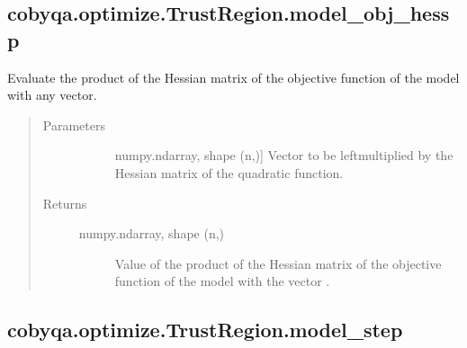 \documentclass[letterpaper,10pt,english]{sphinxmanual}
\begin{document}
\begin{fulllineitems}
\subsection{cobyqa.optimize.TrustRegion.model\_obj\_hessp}
\label{\detokenize{refs/generated/cobyqa.optimize.TrustRegion.model_obj_hessp:cobyqa-optimize-trustregion-model-obj-hessp}}\label{\detokenize{refs/generated/cobyqa.optimize.TrustRegion.model_obj_hessp::doc}}

\begin{fulllineitems}
\label{\detokenize{refs/generated/cobyqa.optimize.TrustRegion.model_obj_hessp:cobyqa.optimize.TrustRegion.model_obj_hessp}}
\sphinxAtStartPar
Evaluate the product of the Hessian matrix of the objective function of
the model with any vector.
\begin{quote}\begin{description}
\item[{Parameters}] \leavevmode\begin{description}
\item[{}] \leavevmode{[}numpy.ndarray, shape (n,){]}
\sphinxAtStartPar
Vector to be left\sphinxhyphen{}multiplied by the Hessian matrix of the quadratic
function.

\end{description}

\item[{Returns}] \leavevmode\begin{description}
\item[{numpy.ndarray, shape (n,)}] \leavevmode
\sphinxAtStartPar
Value of the product of the Hessian matrix of the objective function
of the model with the vector .

\end{description}

\end{description}\end{quote}

\end{fulllineitems}



\subsection{cobyqa.optimize.TrustRegion.model\_step}
\label{\detokenize{refs/generated/cobyqa.optimize.TrustRegion.model_step:cobyqa-optimize-trustregion-model-step}}\label{\detokenize{refs/generated/cobyqa.optimize.TrustRegion.model_step::doc}}


\end{fulllineitems}
\end{document}
